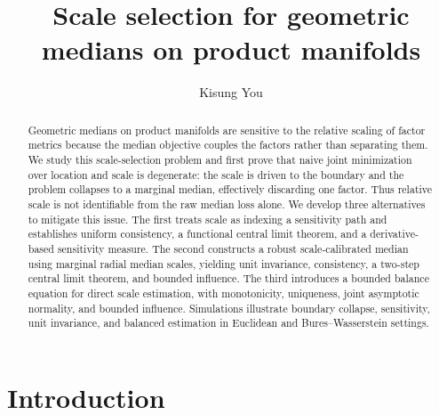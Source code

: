 \documentclass[11pt]{article}
\newcommand{\1}{\mathbf{1}}
\begin{document}
	
\title{Scale selection for geometric medians on product manifolds}
\author[1,2]{Kisung You}
\date{}

\maketitle
\begin{abstract}
Geometric medians on product manifolds are sensitive to the relative scaling of factor metrics because the median objective couples the factors rather than separating them.  We study this scale-selection problem and first prove that naive joint minimization over location and scale is degenerate: the scale is driven to the boundary and the problem collapses to a marginal median, effectively discarding one factor.  Thus relative scale is not identifiable from the raw median loss alone. We develop three alternatives to mitigate this issue. The first treats scale as indexing a sensitivity path and establishes uniform consistency, a functional central limit theorem, and a derivative-based sensitivity measure.  The second constructs a robust scale-calibrated median using marginal radial median scales, yielding unit invariance, consistency, a two-step central limit theorem, and bounded influence.  The third introduces a bounded balance equation for direct scale estimation, with monotonicity, uniqueness, joint asymptotic normality, and bounded influence.  Simulations illustrate boundary collapse, sensitivity, unit invariance, and balanced estimation in Euclidean and Bures--Wasserstein settings.
\end{abstract}




\section{Introduction}
\end{document}
